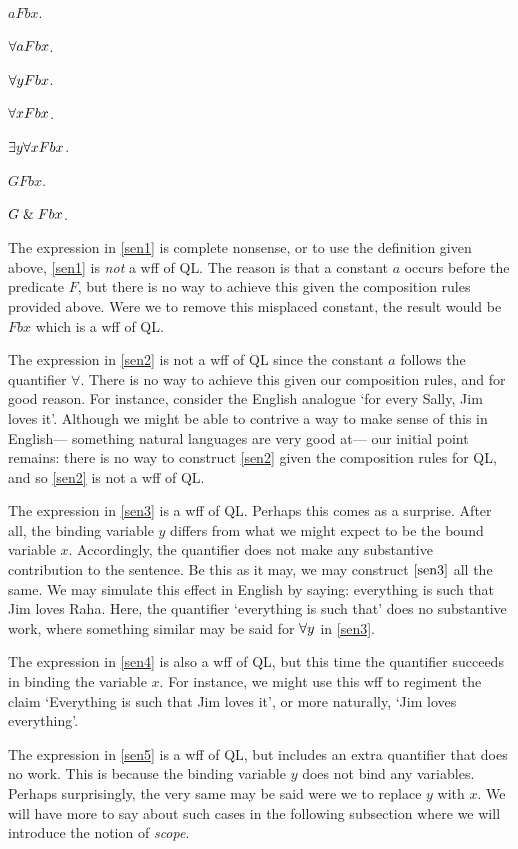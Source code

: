 \begin{earg}
  \item[\ex{sen1}] $aFbx$.
  \item[\ex{sen2}] $\forall aFbx$.
  \item[\ex{sen3}] $\forall yFbx$.
  \item[\ex{sen4}] $\forall xFbx$.
  \item[\ex{sen5}] $\exists y \forall xFbx$.
  \item[\ex{sen6}] $GFbx$.
  \item[\ex{sen7}] $G \mathrel\& Fbx$.
\end{earg}

The expression in \ref{sen1} is complete nonsense, or to use the definition given above, \ref{sen1} is \textit{not} a wff of QL.
The reason is that a constant $a$ occurs before the predicate $F$, but there is no way to achieve this given the composition rules provided above.
Were we to remove this misplaced constant, the result would be $Fbx$ which is a wff of QL. 

The expression in \ref{sen2} is not a wff of QL since the constant $a$ follows the quantifier $\forall$.
There is no way to achieve this given our composition rules, and for good reason.
For instance, consider the English analogue `for every Sally, Jim loves it'.
Although we might be able to contrive a way to make sense of this in English--- something natural languages are very good at--- our initial point remains: there is no way to construct \ref{sen2} given the composition rules for QL, and so \ref{sen2} is not a wff of QL.

The expression in \ref{sen3} is a wff of QL.
Perhaps this comes as a surprise.
After all, the binding variable $y$ differs from what we might expect to be the bound variable $x$.
Accordingly, the quantifier does not make any substantive contribution to the sentence.
Be this as it may, we may construct $\ref{sen3}$ all the same.
We may simulate this effect in English by saying: everything is such that Jim loves Raha.
Here, the quantifier `everything is such that' does no substantive work, where something similar may be said for $\forall y$ in \ref{sen3}.

The expression in \ref{sen4} is also a wff of QL, but this time the quantifier succeeds in binding the variable $x$.
For instance, we might use this wff to regiment the claim `Everything is such that Jim loves it', or more naturally, `Jim loves everything'.

The expression in \ref{sen5} is a wff of QL, but includes an extra quantifier that does no work.
This is because the binding variable $y$ does not bind any variables. 
Perhaps surprisingly, the very same may be said were we to replace $y$ with $x$.
We will have more to say about such cases in the following subsection where we will introduce the notion of \textit{scope}.

